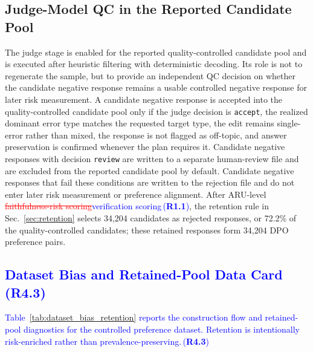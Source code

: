 \documentclass[a4paper,fleqn,doubleblind]{cas-sc}
\DeclareRobustCommand{\deleted}[1]{\textcolor{red}{\sout{#1}}}
\DeclareRobustCommand{\added}[1]{\textcolor{blue}{#1}}
\DeclareRobustCommand{\revtag}[1]{\textcolor{blue}{\scriptsize\,(\textbf{#1})}}
\begin{document}
\subsection{Judge-Model QC in the Reported Candidate Pool}

The judge stage is enabled for the reported quality-controlled candidate pool and is executed after heuristic filtering with deterministic decoding. Its role is not to regenerate the sample, but to provide an independent QC decision on whether the candidate negative response remains a usable controlled negative response for later risk measurement. A candidate negative response is accepted into the quality-controlled candidate pool only if the judge decision is \texttt{accept}, the realized dominant error type matches the requested target type, the edit remains single-error rather than mixed, the response is not flagged as off-topic, and answer preservation is confirmed whenever the plan requires it. Candidate negative responses with decision \texttt{review} are written to a separate human-review file and are excluded from the reported candidate pool by default. Candidate negative responses that fail these conditions are written to the rejection file and do not enter later risk measurement or preference alignment. After ARU-level \deleted{faithfulness-risk scoring}\added{verification scoring}\revtag{R1.1}, the retention rule in Sec.~\ref{sec:retention} selects 34,204 candidates as rejected responses, or 72.2\% of the quality-controlled candidates; these retained responses form 34,204 DPO preference pairs.

\subsection{\added{Dataset Bias and Retained-Pool Data Card}\revtag{R4.3}}
\label{app:dataset_bias_details}

\added{Table~\ref{tab:dataset_bias_retention} reports the construction flow and retained-pool diagnostics for the controlled preference dataset. Retention is intentionally risk-enriched rather than prevalence-preserving.}\revtag{R4.3}
\end{document}
